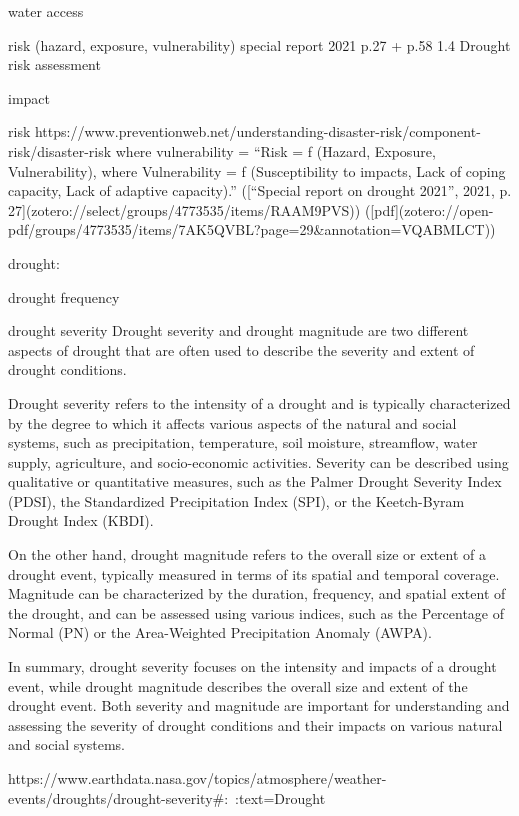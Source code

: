 {water access



risk (hazard, exposure, vulnerability)
special report 2021 p.27 + p.58 1.4 Drought risk assessment

impact

risk
https://www.preventionweb.net/understanding-disaster-risk/component-risk/disaster-risk
where vulnerability = “Risk = ƒ (Hazard, Exposure, Vulnerability), where Vulnerability = ƒ (Susceptibility to impacts, Lack of coping capacity, Lack of adaptive capacity).” ([“Special report on drought 2021”, 2021, p. 27](zotero://select/groups/4773535/items/RAAM9PVS)) ([pdf](zotero://open-pdf/groups/4773535/items/7AK5QVBL?page=29&annotation=VQABMLCT))


drought:



drought frequency


drought severity
Drought severity and drought magnitude are two different aspects of drought that are often used to describe the severity and extent of drought conditions.

Drought severity refers to the intensity of a drought and is typically characterized by the degree to which it affects various aspects of the natural and social systems, such as precipitation, temperature, soil moisture, streamflow, water supply, agriculture, and socio-economic activities. Severity can be described using qualitative or quantitative measures, such as the Palmer Drought Severity Index (PDSI), the Standardized Precipitation Index (SPI), or the Keetch-Byram Drought Index (KBDI).

On the other hand, drought magnitude refers to the overall size or extent of a drought event, typically measured in terms of its spatial and temporal coverage. Magnitude can be characterized by the duration, frequency, and spatial extent of the drought, and can be assessed using various indices, such as the Percentage of Normal (PN) or the Area-Weighted Precipitation Anomaly (AWPA).

In summary, drought severity focuses on the intensity and impacts of a drought event, while drought magnitude describes the overall size and extent of the drought event. Both severity and magnitude are important for understanding and assessing the severity of drought conditions and their impacts on various natural and social systems.

https://www.earthdata.nasa.gov/topics/atmosphere/weather-events/droughts/drought-severity#:~:text=Drought%

}
